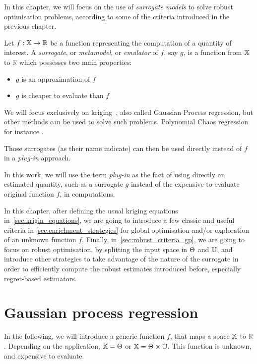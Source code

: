 \documentclass[../../Main_ManuscritThese.tex]{subfiles}
\begin{document}
In this chapter, we will focus on the use of \emph{surrogate models}
to solve robust optimisation problems, according to some of the
criteria introduced in the previous chapter.
\begin{definition}
  Let $f: \mathbb{X} \rightarrow \mathbb{R}$ be a function representing
  the computation of a quantity of interest. A \emph{surrogate}, or
  \emph{metamodel}, or \emph{emulator} of $f$, say $g$, is a function
  from $\mathbb{X}$ to $\mathbb{R}$ which possesses two main properties:
  \begin{itemize}
  \item $g$ is an approximation of $f$
  \item $g$ is cheaper to evaluate than $f$ 
  \end{itemize}
\end{definition}
We will focus exclusively on
kriging~\citep{krige_statistical_1951,matheron_traite_1962}, also
called Gaussian Process regression, but other methods can be used to
solve such problems. Polynomial Chaos regression for instance
\cite{wiener_homogeneous_1938,xiu_wiener--askey_2002,sudret_polynomial_2015,miranda_adjoint-based_2016}. %

Those surrogates (as their name indicate) can then be used directly
instead of $f$ in a \emph{plug-in} approach.
\begin{definition}
  \label{def:plugin}
  In this work, we will use the term \emph{plug-in} as the fact of
  using directly an estimated quantity, such as a surrogate $g$
  instead of the expensive-to-evaluate original function $f$, in
  computations.
\end{definition}

In this chapter, after defining the usual kriging equations
in~\cref{sec:krigin_equations}, we are going to introduce a few
classic and useful criteria in \cref{sec:enrichment_strategies} for
global optimisation and/or exploration of an unknown function
$f$. Finally, in~\cref{sec:robust_criteria_gp}, we are going to focus
on robust optimisation, by splitting the input space in $\Theta$ and
$\mathbb{U}$, and introduce other strategies to take advantage of the
nature of the surrogate in order to efficiently compute the robust
estimates introduced before, especially regret-based estimators.

\section{Gaussian process regression}
In the following, we will introduce a generic function $f$, that maps
a space $\mathbb{X}$ to $\mathbb{R}$. Depending on the application,
$\mathbb{X} = \Theta$ or $\mathbb{X} = \Theta \times \mathbb{U}$. This
function is unknown, and expensive to evaluate.
\end{document}
